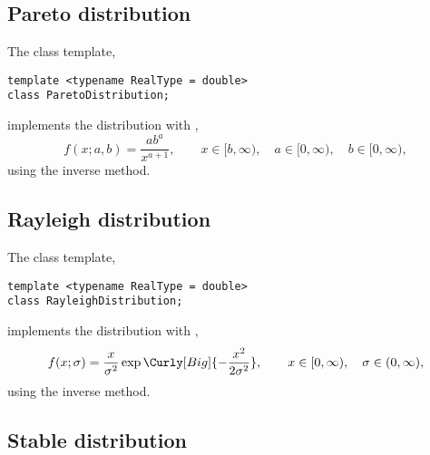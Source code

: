 \subsection{Pareto distribution}
\label{sub:Pareto distribution}

The class template,
\begin{verbatim}
template <typename RealType = double>
class ParetoDistribution;
\end{verbatim}
implements the distribution with \pdf,
\begin{equation*}
  f(x;a,b) = \frac{a b^a}{x^{a + 1}},\qquad
  x \in [b, \infty),\quad a \in [0, \infty),\quad b \in [0, \infty),
\end{equation*}
using the inverse method.

\subsection{Rayleigh distribution}
\label{sub:Rayleigh distribution}

The class template,
\begin{verbatim}
template <typename RealType = double>
class RayleighDistribution;
\end{verbatim}
implements the distribution with \pdf,
\begin{equation*}
  f(x;\sigma) =
  \frac{x}{\sigma^2}\exp\Curly[Big]{-\frac{x^2}{2\sigma^2}},\qquad
  x \in [0, \infty),\quad \sigma \in (0, \infty),
\end{equation*}
using the inverse method.

\subsection{Stable distribution}
\label{sub:Stable distribution}

